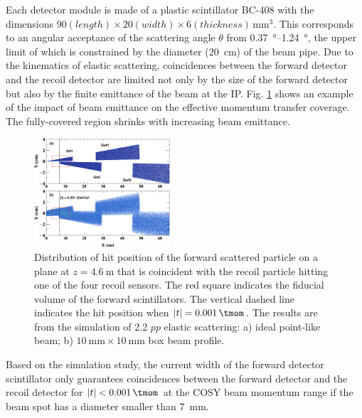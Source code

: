 \documentclass[number,5p]{elsarticle}
\begin{document}
Each detector module is made of a plastic scintillator BC-408 \cite{bc408} with the dimensions $90 (length) \times 20 (width) \times 6
(thickness)\,\si{\mm\tothe{3}}$.
This corresponds to an angular acceptance of the scattering angle $\theta$ from
\SIrange[range-units=repeat]{0.37}{1.24}{\degree}, the upper limit of which is
constrained by the diameter (\SI{20}{\cm}) of the beam pipe.
Due to the kinematics of elastic scattering, coincidences between the forward
detector and the recoil detector are limited not only by the size of the forward
detector but also by the finite emittance of the beam at the IP.
Fig. \ref{fig:forward_acceptance} shows an example of the impact of beam emittance on the
effective momentum transfer coverage.
The fully-covered region shrinks with increasing beam emittance. 
\begin{figure}[htb]
  \centering
  \includegraphics[width=0.45\textwidth]{./fwd_acceptance.png}
  \caption{
    Distribution of hit position of the forward scattered particle on a plane at
    $z=\SI{4.6}{\m}$ that is coincident with the recoil particle hitting one of
    the four recoil sensors.
    The red square indicates the fiducial volume of the forward scintillators.
    The vertical dashed line indicates the hit position when $|t| = \SI{0.001}{\tmom}$.
    The results are from the simulation of \SI{2.2}{\momentum}
    $pp$ elastic scattering: a) ideal point-like beam; b) $\SI{10}{\mm}\times\SI{10}{\mm}$ box beam profile.
    }
  \label{fig:forward_acceptance}
\end{figure}
Based on the simulation study, the current width of the forward detector
scintillator only guarantees coincidences between the forward detector and the
recoil detector for $|t| < \SI{0.001}{\tmom}$ at the COSY beam momentum range if the beam spot has a diameter smaller than \SI{7}{\mm}.
\end{document}
